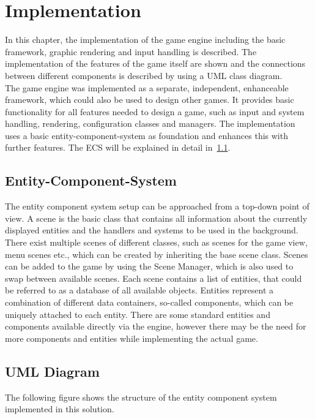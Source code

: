 \section{Implementation}\label{sec:implementation}
In this chapter, the implementation of the game engine including the basic framework, graphic rendering and input handling is described.
The implementation of the features of the game itself are shown and the connections between different components is described by using a
UML class diagram.
\\
The game engine was implemented as a separate, independent, enhanceable framework, which could also be used to design other
games.
It provides basic functionality for all features needed to design a game, such as input and system handling, rendering, configuration
classes and managers.
The implementation uses a basic entity-component-system as foundation and enhances this with further features.
The ECS will be explained in detail in~\ref{subsec:entity-component-system}.

\subsection{Entity-Component-System}\label{subsec:entity-component-system}
The entity component system setup can be approached from a top-down point of view.
A scene is the basic class that contains all information about the currently displayed entities and the handlers and systems to be used
in the background.
There exist multiple scenes of different classes, such as scenes for the game view, menu scenes etc., which can be created by
inheriting the base scene class.
Scenes can be added to the game by using the Scene Manager, which is also used to swap between available scenes.
Each scene contains a list of entities, that could be referred to as a database of all available objects.
Entities represent a combination of different data containers, so-called components, which can be uniquely attached to each entity.
There are some standard entities and components available directly via the engine, however there may be the need for more components and entities while implementing the actual game.

\subsection{UML Diagram}\label{subsec:uml-diagram}
The following figure shows the structure of the entity component system implemented in this solution.

